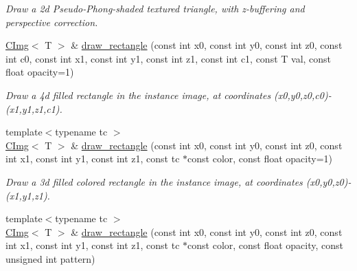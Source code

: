 \begin{DoxyCompactItemize}
\begin{DoxyCompactList}\small\item\em Draw a 2d Pseudo-\/Phong-\/shaded textured triangle, with z-\/buffering and perspective correction. \item\end{DoxyCompactList}\item 
\hyperlink{structcimg__library_1_1CImg}{CImg}$<$ T $>$ \& \hyperlink{structcimg__library_1_1CImg_a6ae0634808824131083214f2a5a518ca}{draw\_\-rectangle} (const int x0, const int y0, const int z0, const int c0, const int x1, const int y1, const int z1, const int c1, const T val, const float opacity=1)
\begin{DoxyCompactList}\small\item\em Draw a 4d filled rectangle in the instance image, at coordinates ({\ttfamily x0},{\ttfamily y0},{\ttfamily z0},{\ttfamily c0})-\/({\ttfamily x1},{\ttfamily y1},{\ttfamily z1},{\ttfamily c1}). \item\end{DoxyCompactList}\item 
{\footnotesize template$<$typename tc $>$ }\\\hyperlink{structcimg__library_1_1CImg}{CImg}$<$ T $>$ \& \hyperlink{structcimg__library_1_1CImg_a99614589c3d114e81db5eb6efc322e0c}{draw\_\-rectangle} (const int x0, const int y0, const int z0, const int x1, const int y1, const int z1, const tc $\ast$const color, const float opacity=1)
\begin{DoxyCompactList}\small\item\em Draw a 3d filled colored rectangle in the instance image, at coordinates ({\ttfamily x0},{\ttfamily y0},{\ttfamily z0})-\/({\ttfamily x1},{\ttfamily y1},{\ttfamily z1}). \item\end{DoxyCompactList}\item 
\hypertarget{structcimg__library_1_1CImg_a1bf777ba2034fce1fe6a77fef5c236df}{
{\footnotesize template$<$typename tc $>$ }\\\hyperlink{structcimg__library_1_1CImg}{CImg}$<$ T $>$ \& \hyperlink{structcimg__library_1_1CImg_a1bf777ba2034fce1fe6a77fef5c236df}{draw\_\-rectangle} (const int x0, const int y0, const int z0, const int x1, const int y1, const int z1, const tc $\ast$const color, const float opacity, const unsigned int pattern)}
\label{structcimg__library_1_1CImg_a1bf777ba2034fce1fe6a77fef5c236df}


\end{DoxyCompactItemize}
